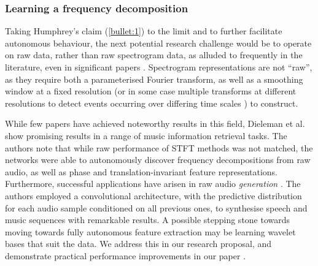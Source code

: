 \documentclass[12pt]{llncs}
\begin{document}

	




\subsubsection{Learning a frequency decomposition}

Taking Humphrey's claim (\ref{bullet:1}) to the limit and to further facilitate autonomous behaviour, the next potential research challenge would be to operate on raw data, rather than raw spectrogram data, as alluded to frequently in the literature, even in significant papers \cite{lee2009unsupervised}. Spectrogram representations are not ``raw'', as they require both a parameterised Fourier transform, as well as a smoothing window at a fixed resolution (or in some case multiple transforms at different resolutions to detect events occurring over differing time scales \cite{espi2015exploiting}) to construct.

While few papers have achieved noteworthy results in this field, Dieleman et al. \cite{dieleman2014end} show promising results in a range of music information retrieval tasks. The authors note that while raw performance of STFT methods was not matched, the networks were able to autonomously discover frequency decompositions from raw audio, as well as phase and translation-invariant feature representations. Furthermore, successful applications have arisen in raw audio \emph{generation} \cite{van2016wavenet}. The authors employed a convolutional architecture, with the predictive distribution for each audio sample conditioned on all previous ones, to synthesise speech and music sequences with remarkable results. A possible stepping stone towards moving towards fully autonomous feature extraction may be learning wavelet bases that suit the data. We address this in our research proposal, and demonstrate practical performance improvements in our paper \cite[Section 5]{kiskin2017mosquito}.
\end{document}
